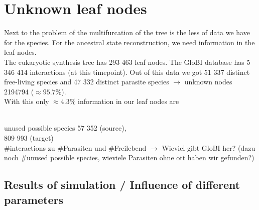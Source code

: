   \section{Unknown leaf nodes}
    Next to the problem of the multifurcation of the tree is the less of data we have for the species.
      For the ancestral state reconstruction, we need information in the leaf nodes. \\
    The eukaryotic synthesis tree has 293 463 leaf nodes. The GloBI database has 5 346 414 interactions 
      (at this timepoint). Out of this data we got 51 337 distinct free-living species and 47 332 
      distinct parasite species $\rightarrow$ unknown nodes 2194794 ($\approx 95.7\%$). \\
    With this only $\approx 4.3\%$ information in our leaf nodes are 

     \\
    unused possible species  57 352 (source), \\
    809 993 (target) \\
    \#interactions zu \#Parasiten und \#Freilebend $\rightarrow$ Wieviel gibt GloBI her? (dazu noch 
      \#unused possible species, wieviele Parasiten ohne ott haben wir gefunden?)

    \subsection{Results of simulation / Influence of different parameters}

